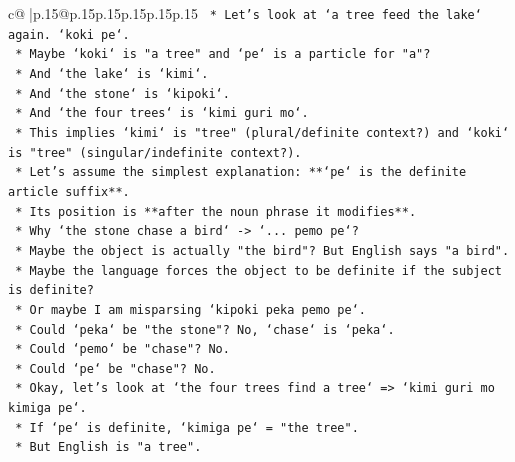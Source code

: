 \documentclass{article}
\begin{document}
{\begin{supertabular}{c@{$\;$}|p{.15\linewidth}@{}p{.15\linewidth}p{.15\linewidth}p{.15\linewidth}p{.15\linewidth}p{.15\linewidth}}
{{{\texttt{                                        *   Let's look at `a tree feed the lake` again. `koki pe`.} \\
\texttt{                                        *   Maybe `koki` is "a tree" and `pe` is a particle for "a"?} \\
\texttt{                                        *   And `the lake` is `kimi`.} \\
\texttt{                                        *   And `the stone` is `kipoki`.} \\
\texttt{                                        *   And `the four trees` is `kimi guri mo`.} \\
\texttt{                                        *   This implies `kimi` is "tree" (plural/definite context?) and `koki` is "tree" (singular/indefinite context?).} \\
\texttt{                                        *   Let's assume the simplest explanation: **`pe` is the definite article suffix**.} \\
\texttt{                                        *   Its position is **after the noun phrase it modifies**.} \\
\texttt{                                        *   Why `the stone chase a bird` {-}> `... pemo pe`?} \\
\texttt{                                            *   Maybe the object is actually "the bird"? But English says "a bird".} \\
\texttt{                                            *   Maybe the language forces the object to be definite if the subject is definite?} \\
\texttt{                                            *   Or maybe I am misparsing `kipoki peka pemo pe`.} \\
\texttt{                                            *   Could `peka` be "the stone"? No, `chase` is `peka`.} \\
\texttt{                                            *   Could `pemo` be "chase"? No.} \\
\texttt{                                            *   Could `pe` be "chase"? No.} \\
\texttt{                                            *   Okay, let's look at `the four trees find a tree` => `kimi guri mo kimiga pe`.} \\
\texttt{                                            *   If `pe` is definite, `kimiga pe` = "the tree".} \\
\texttt{                                            *   But English is "a tree".} \\
}}}
\end{supertabular}}
\end{document}
